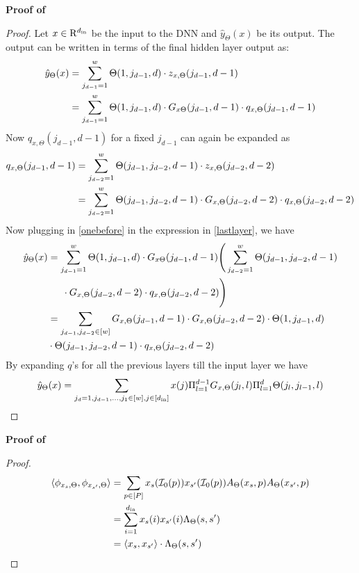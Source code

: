 \begin{appendix}
\textbf{Proof of }
\begin{proof}
Let $x\in\mathrm{R}^{d_{\text{in}}}$ be the input to the DNN and $\hat{y}_{\Theta}(x)$ be its output. The output can be written in terms of the final hidden layer output as:
\begin{align}
\hat{y}_{\Theta}(x)&=\sum_{j_{d-1}=1}^w\Theta(1, j_{d-1},d) \cdot z_{x,\Theta}(j_{d-1},d-1)\nonumber\\
\label{lastlayer}&=\sum_{j_{d-1}=1}^w\Theta(1, j_{d-1},d) \cdot G_{x\Theta}(j_{d-1},d-1)\cdot q_{x,\Theta}(j_{d-1},d-1)
\end{align}
Now $q_{x,\Theta}(j_{d-1},d-1)$ for a fixed $j_{d-1}$ can again be expanded as
\begin{align}
q_{x,\Theta}(j_{d-1},d-1)&= \sum_{j_{d-2}=1}^w \Theta(j_{d-1},j_{d-2},d-1) \cdot z_{x,\Theta}(j_{d-2},d-2)\nonumber\\
\label{onebefore}&=\sum_{j_{d-2}=1}^w \Theta(j_{d-1},j_{d-2},d-1) \cdot G_{x,\Theta}(j_{d-2},d-2)\cdot q_{x,\Theta}(j_{d-2},d-2)
\end{align}
Now plugging in \eqref{onebefore} in the expression in \eqref{lastlayer}, we have
\begin{align}
\hat{y}_{\Theta}(x)&=\sum_{j_{d-1}=1}^w\Theta(1, j_{d-1},d)\cdot G_{x\Theta}(j_{d-1},d-1)\Bigg(\sum_{j_{d-2}=1}^w \Theta(j_{d-1},j_{d-2},d-1)\nonumber\\ &\hspace{15pt}\cdot G_{x,\Theta}(j_{d-2},d-2)\cdot q_{x,\Theta}(j_{d-2},d-2)\Bigg)\nonumber\\
&=\sum_{j_{d-1}, j_{d-2}\in[w]} G_{x,\Theta}(j_{d-1},d-1)\cdot G_{x,\Theta}(j_{d-2},d-2)\cdot\Theta(1, j_{d-1},d)\nonumber\\&\cdot \Theta(j_{d-1},j_{d-2},d-1)\cdot q_{x,\Theta}(j_{d-2},d-2)\nonumber\\
\end{align}
By expanding $q$'s for all the previous layers till the input layer we have
\begin{align}
\hat{y}_{\Theta}(x)=\sum_{j_{d}=1, j_{d-1},\ldots,j_{1}\in[w], j\in[d_{\text{in}}]} x(j) \Pi_{l=1}^{d-1}G_{x,\Theta}(j_{l},l) \Pi_{l=1}^{d}\Theta(j_l, j_{l-1}, l) \nonumber
\end{align}
\end{proof}

\textbf{Proof of }
\begin{proof}
\begin{align}
\langle \phi_{x_s,\Theta},\phi_{x_{s'},\Theta}\rangle&=\sum_{p\in[P]}x_s(\mathcal{I}_0(p))x_{s'}(\mathcal{I}_0(p))A_{\Theta}(x_s,p)A_{\Theta}(x_{s'},p)\nonumber\\
&=\sum_{i=1}^{d_{\text{in}}}x_s(i)x_{s'}(i)\Lambda_{\Theta}(s,s')\nonumber\\
&=\langle x_s,x_{s'}\rangle\cdot\Lambda_{\Theta}(s,s')
\end{align}
\end{proof}


\end{appendix}
